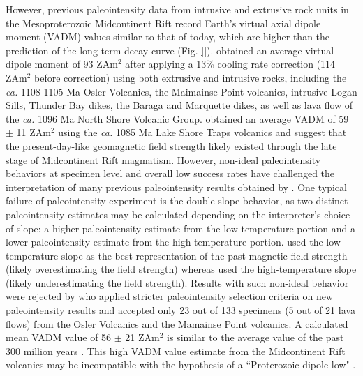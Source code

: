 \documentclass[draft]{agujournal2019}
\begin{document}
However, previous paleointensity data from intrusive and extrusive rock units in the Mesoproterozoic Midcontinent Rift \cite{Pesonen1983a, Kulakov2013a, Sprain2018a} record Earth's virtual axial dipole moment (VADM) values similar to that of today, which are higher than the prediction of the long term decay curve (Fig. \ref{}).  obtained an average virtual dipole moment of 93 ZAm$^2$ after applying a 13\% cooling rate correction (114 ZAm$^2$ before correction) using both extrusive and intrusive rocks, including the \textit{ca.} 1108-1105 Ma Osler Volcanics, the Maimainse Point volcanics, intrusive Logan Sills, Thunder Bay dikes, the Baraga and Marquette dikes, as well as lava flow of the \textit{ca.} 1096 Ma North Shore Volcanic Group.  obtained an average VADM of 59 $\pm$ 11 ZAm$^2$ using the \textit{ca.} 1085 Ma Lake Shore Traps volcanics and suggest that the present-day-like geomagnetic field strength likely existed through the late stage of Midcontinent Rift magmatism. However, non-ideal paleointensity behaviors at specimen level and overall low success rates have challenged the interpretation of many previous paleointensity results obtained by . One typical failure of paleointensity experiment is the double-slope behavior, as two distinct paleointensity estimates may be calculated depending on the interpreter's choice of slope: a higher paleointensity estimate from the low-temperature portion and a lower paleointensity estimate from the high-temperature portion.  used the low-temperature slope as the best representation of the past magnetic field strength (likely overestimating the field strength) whereas  used the high-temperature slope (likely underestimating the field strength). Results with such non-ideal behavior were rejected by  who applied stricter paleointensity selection criteria on new paleointensity results and accepted only 23 out of 133 specimens (5 out of 21 lava flows) from the Osler Volcanics and the Mamainse Point volcanics. A calculated mean VADM value of 56 $\pm$ 21 ZAm$^2$ is similar to the average value of the past 300 million years \cite{Sprain2018a}. This high VADM value estimate from the Midcontinent Rift volcanics may be incompatible with the hypothesis of a ``Proterozoic dipole low" \cite{Biggin2009a}. 
\end{document}
